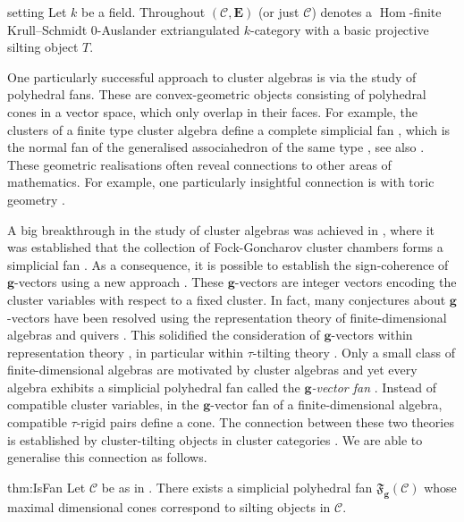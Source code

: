 \documentclass[10pt,twoside, a4paper,reqno]{amsart}
\DeclareMathOperator{\Hom}{Hom}
\newcommand{\partfan}[1]{\mathfrak{F}_{\bfg}(#1)}
\newcommand{\calC}{\mathcal{C}}
\newcommand{\E}{\mathbf{E}}
\newcommand{\bfg}{\mathbf{g}}
\theoremstyle{definition}
\begin{document}
\begin{repsetup}{setting}
    Let $k$ be a field. Throughout $(\calC,\E)$ (or just $\calC$) denotes a $\Hom$-finite Krull--Schmidt 0-Auslander extriangulated $k$-category with a basic projective silting object $T$. 
\end{repsetup}


One particularly successful approach to cluster algebras is via the study of polyhedral fans. These are convex-geometric objects consisting of polyhedral cones in a vector space, which only overlap in their faces. For example, the clusters of a finite type cluster algebra define a complete simplicial fan \cite[{Thm.} 1.10]{FZ2003}, which is the normal fan of the generalised associahedron of the same type \cite[{Thm.} 1.4]{CFZ2002}, see also \cite{HLT2011,HPS2018,ReadingSpeyer2009}. These geometric realisations often reveal connections to other areas of mathematics. For example, one particularly insightful connection is with toric geometry \cite{GHK15,GHKK18}. 

A big breakthrough in the study of cluster algebras was achieved in \cite{GHKK18}, where it was established that the collection of Fock-Goncharov cluster chambers \cite{FG06} forms a simplicial fan \cite[{Thm.} 0.8]{GHKK18}. As a consequence, it is possible to establish the sign-coherence of $\bfg$-vectors using a new approach \cite[{Thm.} 5.11]{GHKK18}. These $\bfg$-vectors are integer vectors encoding the cluster variables with respect to a fixed cluster. In fact, many conjectures about $\bfg$-vectors have been resolved using the representation theory of finite-dimensional algebras and quivers \cite{DWZ2010}. This solidified the consideration of $\bfg$-vectors within representation theory \cite{DK08}, in particular within $\tau$-tilting theory \cite{AIR2014, DerksenFei2015}. Only a small class of finite-dimensional algebras are motivated by cluster algebras and yet every algebra exhibits a simplicial polyhedral fan called the \textit{$\bfg$-vector fan} \cite{DIJ2019}. Instead of compatible cluster variables, in the $\bfg$-vector fan of a finite-dimensional algebra, compatible $\tau$-rigid pairs define a cone. The connection between these two theories is established by cluster-tilting objects in cluster categories \cite{BMRRT06}. We are able to generalise this {connection} as follows.


\begin{reptheorem}{thm:IsFan}
    Let $\calC$ be as in . There exists a simplicial polyhedral fan $\partfan{\calC}$ whose maximal dimensional cones correspond to silting objects in $\calC$.
\end{reptheorem}
\end{document}
